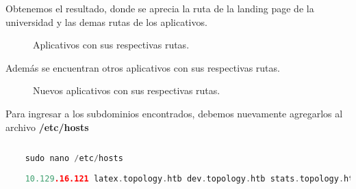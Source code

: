 \documentclass[a4paper]{article} %
\begin{document}
    \vspace{3cm}

    Obtenemos el resultado, donde se aprecia la ruta de la landing page de la universidad y las demas rutas de los aplicativos.

    \begin{figure}[h] %
        \begin{center}
        \setlength{\fboxsep}{0.2em} %
        \end{center}
        \captionsetup{labelfont=bf} %
        \caption{Aplicativos con sus respectivas rutas.}
    \end{figure}

    \vspace{10cm}

    Además se encuentran otros aplicativos con sus respectivas rutas.

    \begin{figure}[h] %
        \begin{center}
        \setlength{\fboxsep}{0.2em} %
        \end{center}
        \captionsetup{labelfont=bf} %
        \caption{Nuevos aplicativos con sus respectivas rutas.}
    \end{figure}

    Para ingresar a los subdominios encontrados, debemos nuevamente agregarlos al archivo \textbf{/etc/hosts}

    \captionsetup[lstlisting]{labelfont=bf} %
    \begin{lstlisting}[language=c, caption=Agregando subdominios al archivo /etc/hosts, aboveskip=0.5cm]
        
    sudo nano /etc/hosts
          
    10.129.16.121 latex.topology.htb dev.topology.htb stats.topology.htb
    \end{lstlisting}

    \vspace{6cm}
\end{document}
